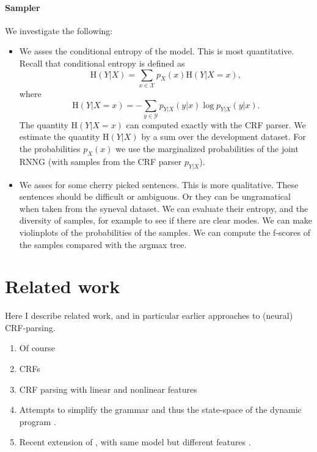 \paragraph{Sampler} We investigate the following:
\begin{itemize}
  \item We asses the conditional entropy of the model. This is most quantitative. Recall that conditional entropy is defined as
  \begin{equation}
    \text{H}(Y|X) = \sum_{x \in \mathcal{X}} p_X(x)\text{H}(Y|X = x),
  \end{equation}
  where
  \begin{equation}
    \text{H}(Y|X = x) = - \sum_{y \in \mathcal{Y}} p_{Y|X}(y|x) \log p_{Y|X}(y|x).
  \end{equation}
  The quantity $\text{H}(Y|X = x)$ can computed exactly with the CRF parser. We estimate the quantity $\text{H}(Y|X)$ by a sum over the development dataset. For the probabilities $p_X(x)$ we use the marginalized probabilities of the joint RNNG (with samples from the CRF parser $p_{Y|X}$).
  \item We asses for some cherry picked sentences. This is more qualitative. These sentences should be difficult or ambiguous. Or they can be ungramatical when taken from the syneval dataset. We can evaluate their entropy, and the diversity of samples, for example to see if there are clear modes. We can make violinplots of the probabilities of the samples. We can compute the f-scores of the samples compared with the argmax tree.
\end{itemize}

\section{Related work}
Here I describe related work, and in particular earlier approaches to (neural) CRF-parsing.
\begin{enumerate}
  \item Of course \citep{stern2017minimal}
  \item CRFs \citep{sutton2012crf}
  \item CRF parsing with linear and nonlinear features \citep{finkel2008crf,klein2015crf}
  \item Attempts to simplify the grammar and thus the state-space of the dynamic program \citep{hall2014less}.
  \item Recent extension of \citet{stern2017minimal}, with same model but different features \citep{kitaev2018attentive}.
\end{enumerate}



